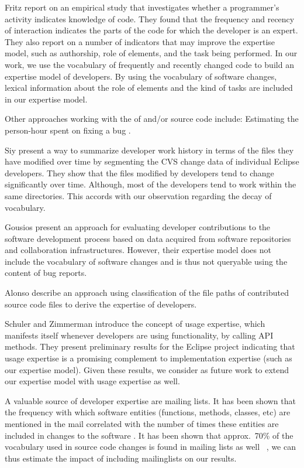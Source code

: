 Fritz \etal \cite{Frit07a} report on an empirical study that investigates whether a programmer's activity indicates knowledge of code. They found that the frequency and recency of interaction  indicates the parts of the code for which the developer is an expert. They also report on a number of indicators that may improve the expertise model, such as authorship, role of elements, and the task being performed. In our work, we use the vocabulary of frequently and recently changed code to build an expertise model of developers. By using the vocabulary of software changes, lexical information about the role of elements and the kind of tasks are included in our expertise model.

Other approaches working with the \VOC of \BRs and/or source code include: Estimating the person-hour spent on fixing a bug \cite{Weis07a}. 

Siy \etal \cite{Siy08a} present a way to summarize developer work history in terms of the files they have modified over time by segmenting the CVS change data of individual Eclipse developers. They show that the files modified by developers tend to change significantly over time. Although, most of the developers tend to work within the same directories. This accords with our observation regarding the decay of vocabulary.

Gousios \etal \cite{Gous08a} present an approach for evaluating developer contributions to the software development process based on data acquired from software repositories and collaboration infrastructures. However, their expertise model does not include the vocabulary of software changes and is thus not queryable using the content of bug reports.

Alonso \etal \cite{Alon08a} describe an approach using classification of the file paths of contributed source code files to derive the expertise of developers. 

Schuler and Zimmerman \cite{Schu08a} introduce the concept of usage expertise, which manifests itself whenever developers are using functionality, \eg by calling API methods. They present preliminary
results for the Eclipse project indicating that usage expertise is a promising complement to implementation expertise (such as our expertise model). Given these results, we consider as future work to extend our expertise model with usage expertise as well.

A valuable source of developer expertise are mailing lists. It has been shown that the frequency with which software entities (functions, methods, classes, etc) are mentioned in the mail correlated with the number of times these entities are included in changes to the software \cite{Patt08a}. It has been shown that approx.\ 70\% of the vocabulary used in source code changes is found in mailing lists as well~ \cite{Bays07a}, we can thus estimate the impact of including mailinglists on our results.  

